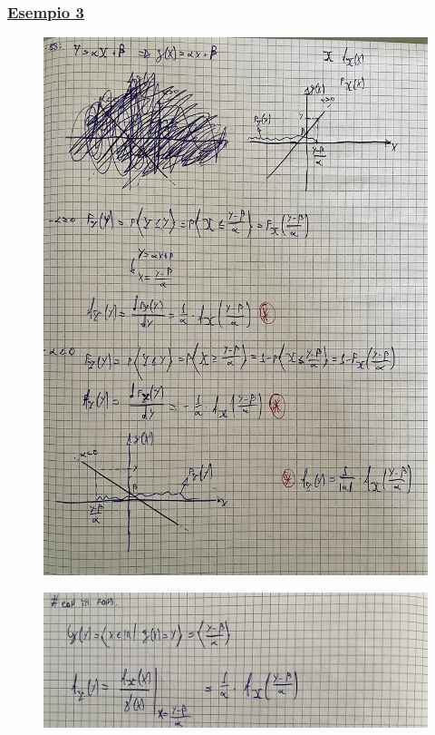 \documentclass{article}
\begin{document}
\subsubsection{\underline{Esempio 3}}
\begin{figure}[ht]
\centering
\includegraphics[scale=0.12]{ese/20.jpeg}
\end{figure}
\begin{figure}[ht]
\centering
\includegraphics[scale=0.11]{ese/20a.jpeg}
\end{figure}
\clearpage
\end{document}

